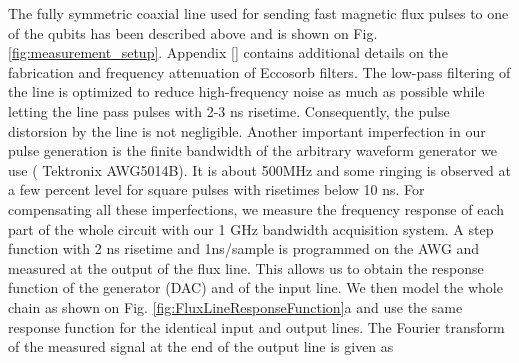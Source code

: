The fully symmetric coaxial line used for sending fast magnetic flux pulses to one of the qubits has been described above and is shown on Fig. \ref{fig:measurement_setup}. Appendix \ref{} contains additional details on the fabrication and frequency attenuation of Eccosorb filters. The low-pass filtering of the line is optimized to reduce high-frequency noise as much as possible while letting the line pass pulses with 2-3 ns risetime. Consequently, the pulse  distorsion by the line is not negligible. Another important imperfection in our pulse generation is the finite bandwidth of the arbitrary waveform generator we use ( Tektronix AWG5014B). It is about 500MHz and some ringing is observed at a few percent level for square pulses with risetimes below 10 ns. For compensating all these imperfections, we measure the frequency response of each part of the whole circuit with our 1 GHz bandwidth acquisition system. A step function with 2 ns risetime and 1ns/sample is programmed on the AWG and measured at the output of the flux line. This allows us to obtain the response function of the generator (DAC) and of the input line. We then model the whole chain as shown on Fig. \ref{fig:FluxLineResponseFunction}a and use the same response function for the identical input and output lines. The Fourier transform of the measured signal at the end of the output line is given as

